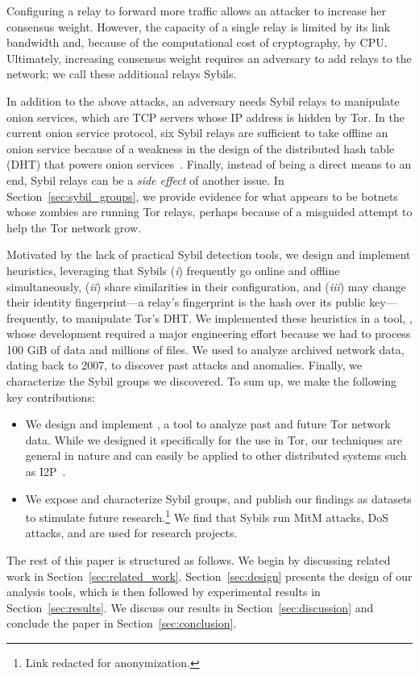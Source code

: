 Configuring a relay to forward more traffic allows an attacker to increase her
consensus weight.  However, the capacity of a single relay is limited by its
link bandwidth and, because of the computational cost of cryptography, by CPU.
Ultimately, increasing consensus weight requires an adversary to add relays to
the network; we call these additional relays Sybils.

In addition to the above attacks, an adversary needs Sybil relays to manipulate
onion services, which are TCP servers whose IP address is hidden by Tor.  In the
current onion service protocol, six Sybil relays are sufficient to take offline
an onion service because of a weakness in the design of the distributed hash
table (DHT) that powers onion services~\cite{Biryukov2013a}.  Finally, instead
of being a direct means to an end, Sybil relays can be a \emph{side effect} of
another issue.  In Section~\ref{sec:sybil_groups}, we provide evidence for what
appears to be botnets whose zombies are running Tor relays, perhaps because of a
misguided attempt to help the Tor network grow.

Motivated by the lack of practical Sybil detection tools, we design and
implement heuristics, leveraging that Sybils (\emph{i}) frequently go online and
offline simultaneously, (\emph{ii}) share similarities in their configuration,
and (\emph{iii}) may change their identity fingerprint---a relay's fingerprint
is the hash over its public key---frequently, to manipulate Tor's DHT.  We
implemented these heuristics in a tool, \sys, whose development required a major
engineering effort because we had to process 100 GiB of data and millions of
files.  We used \sys to analyze archived network data, dating back to 2007, to
discover past attacks and anomalies.  Finally, we characterize the Sybil groups
we discovered.  To sum up, we make the following key contributions:
\begin{itemize}
	\item We design and implement \sys, a tool to analyze past and future Tor
		network data.  While we designed it specifically for the use in Tor, our
		techniques are general in nature and can easily be applied to other
		distributed systems such as I2P~\cite{i2p}.
	\item We expose and characterize Sybil groups, and publish our findings as
		datasets to stimulate future research.\footnote{Link redacted for
		anonymization.}  We find that Sybils run MitM attacks, DoS attacks, and
		are used for research projects.
\end{itemize}

The rest of this paper is structured as follows.  We begin by discussing
related work in Section~\ref{sec:related_work}.  Section~\ref{sec:design}
presents the design of our analysis tools, which is then followed by
experimental results in Section~\ref{sec:results}.  We discuss our results in
Section~\ref{sec:discussion} and conclude the paper in
Section~\ref{sec:conclusion}.
